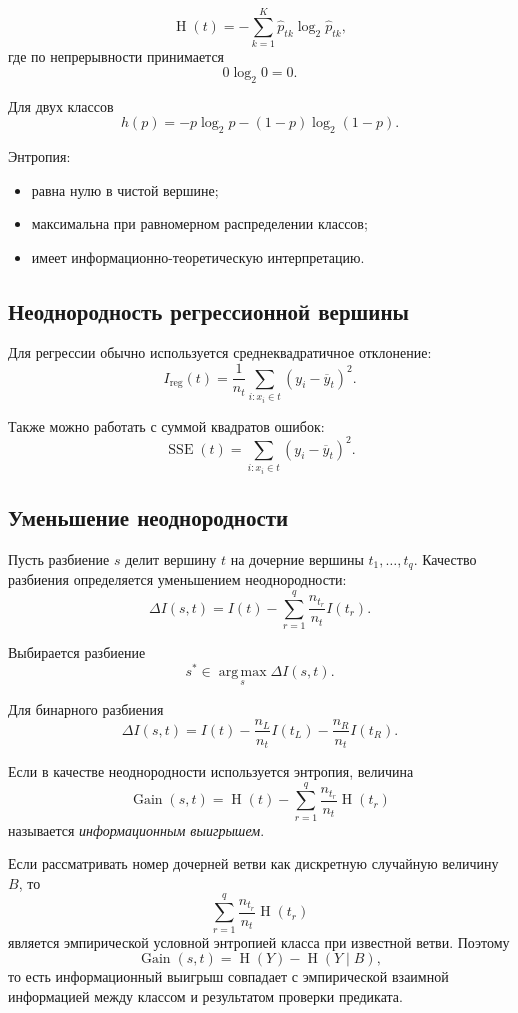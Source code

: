 \documentclass[12pt,a4paper]{article}
\theoremstyle{plain}
\theoremstyle{definition}
\theoremstyle{remark}
\newcommand{\argmax}{\operatorname*{arg\,max}}
\newcommand{\Entropy}{\operatorname{H}}
\newcommand{\Gain}{\operatorname{Gain}}
\begin{document}
\[
    \Entropy(t)
    =
    -\sum_{k=1}^{K}
    \widehat{p}_{tk}
    \log_2\widehat{p}_{tk},
\]
где по непрерывности принимается
\[
    0\log_2 0=0.
\]

Для двух классов
\[
    h(p)
    =
    -p\log_2p-(1-p)\log_2(1-p).
\]

Энтропия:
\begin{itemize}
    \item равна нулю в чистой вершине;
    \item максимальна при равномерном распределении классов;
    \item имеет информационно-теоретическую интерпретацию.
\end{itemize}

\subsection{Неоднородность регрессионной вершины}

Для регрессии обычно используется среднеквадратичное отклонение:
\[
    I_{\mathrm{reg}}(t)
    =
    \frac{1}{n_t}
    \sum_{i:x_i\in t}
    (y_i-\overline{y}_t)^2.
\]

Также можно работать с суммой квадратов ошибок:
\[
    \operatorname{SSE}(t)
    =
    \sum_{i:x_i\in t}
    (y_i-\overline{y}_t)^2.
\]

\subsection{Уменьшение неоднородности}

Пусть разбиение $s$ делит вершину $t$ на дочерние вершины
$t_1,\ldots,t_q$. Качество разбиения определяется уменьшением
неоднородности:
\[
    \Delta I(s,t)
    =
    I(t)
    -
    \sum_{r=1}^{q}
    \frac{n_{t_r}}{n_t}I(t_r).
\]

Выбирается разбиение
\[
    s^*
    \in
    \argmax_s \Delta I(s,t).
\]

Для бинарного разбиения
\[
    \Delta I(s,t)
    =
    I(t)
    -
    \frac{n_L}{n_t}I(t_L)
    -
    \frac{n_R}{n_t}I(t_R).
\]

Если в качестве неоднородности используется энтропия, величина
\[
    \Gain(s,t)
    =
    \Entropy(t)
    -
    \sum_{r=1}^{q}
    \frac{n_{t_r}}{n_t}\Entropy(t_r)
\]
называется \emph{информационным выигрышем}.

Если рассматривать номер дочерней ветви как дискретную случайную
величину $B$, то
\[
    \sum_{r=1}^{q}
    \frac{n_{t_r}}{n_t}\Entropy(t_r)
\]
является эмпирической условной энтропией класса при известной ветви.
Поэтому
\[
    \Gain(s,t)
    =
    \Entropy(Y)-\Entropy(Y\mid B),
\]
то есть информационный выигрыш совпадает с эмпирической взаимной
информацией между классом и результатом проверки предиката.
\end{document}

